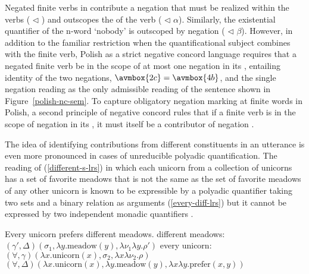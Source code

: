 \documentclass[output=paper]{langsci/langscibook}
\begin{document}
Negated finite verbs in  contribute a negation that must be realized
within the verbs  ( $\triangleleft$ ) and
outscopes the  of the verb ( $\triangleleft$ $\alpha$).
Similarly, the existential quantifier of the n-word  `nobody' is
outscoped by negation ( $\triangleleft$ $\beta$). However, in addition
to the familiar restriction when the quantificational subject combines
with the finite verb, Polish as a strict negative concord language requires
that a negated finite verb be in the scope of at most one negation in
its , entailing identity of the two negations,
$\avmbox{2c}=\avmbox{4b}$, and the single negation reading  as
the only admissible reading of the sentence shown in Figure~\ref{polish-nc-sem}.
To capture obligatory negation marking at finite words in Polish, a second
principle of negative concord rules that if a finite verb is in the scope
of negation in its , it must itself be a contributor of negation \citep[316]{RichterandSailer2001}.

The idea of identifying contributions from different constituents in
an utterance is even more pronounced in cases of unreducible polyadic
quantification. The reading of (\ref{different-s-lrs}) in which each
unicorn from a collection of unicorns has a set of favorite meadows that
is not the same as the set of favorite meadows of any other unicorn is known
to be expressible by a polyadic quantifier taking two sets and a binary
relation as arguments (\ref{every-diff-lrs}) but it cannot be expressed by
two independent monadic quantifiers \citep{Keenan1992b}.


\begin{exe}
\ex\label{different-lrs}
\begin{xlist}
\ex\label{different-s-lrs} Every unicorn prefers different meadows.
\ex \label{different-meadows-lrs}
different meadows: \hspace{0.18cm} $(\gamma', \Delta)(\sigma_1, \lambda y.\text{meadow}(y), \lambda \nu_1\lambda y.\rho')$
\ex \label{every-unicorn-lrs}
every unicorn: \hspace{0.95cm}$(\forall, \gamma)(\lambda x.\text{unicorn}(x), \sigma_2, \lambda x\lambda \nu_2.\rho)$
\ex \label{every-diff-lrs}
$(\forall, \Delta)(\lambda x.\text{unicorn}(x), \lambda y.\text{meadow}(y), \lambda x\lambda y.\text{prefer}(x,y))$
\end{xlist}
\end{exe}
\end{document}
